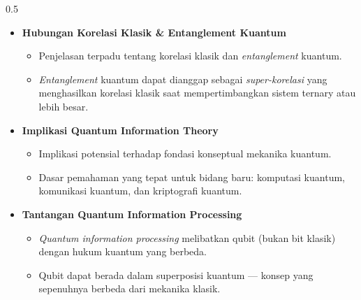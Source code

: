 \begin{frame}
\begin{columns}[T]
        \begin{column}{0.5\textwidth}
            \begin{itemize}\tiny\justifying
                \item \textbf{Hubungan Korelasi Klasik \& Entanglement Kuantum}
                    \begin{itemize}\tiny\justifying
                        \item[$\Rightarrow$] Penjelasan terpadu tentang korelasi klasik
                            dan \textit{entanglement} kuantum.
                        \item[$\Rightarrow$] \textit{Entanglement} kuantum dapat dianggap
                            sebagai \textit{super-korelasi} yang menghasilkan korelasi
                            klasik saat mempertimbangkan sistem ternary atau lebih besar.
                    \end{itemize}
                \item \textbf{Implikasi Quantum Information Theory}
                    \begin{itemize}\tiny\justifying
                        \item[$\Rightarrow$] Implikasi potensial terhadap fondasi
                            konseptual mekanika kuantum.
                        \item[$\Rightarrow$] Dasar pemahaman yang tepat untuk bidang baru:
                            komputasi kuantum, komunikasi kuantum, dan kriptografi kuantum.
                    \end{itemize}
                \item \textbf{Tantangan Quantum Information Processing}
                    \begin{itemize}\tiny\justifying
                        \item[$\Rightarrow$] \textit{Quantum information processing}
                            melibatkan qubit (bukan bit klasik) dengan hukum kuantum
                            yang berbeda.
                        \item[$\Rightarrow$] Qubit dapat berada dalam superposisi
                            kuantum --- konsep yang sepenuhnya berbeda dari mekanika klasik.
                    \end{itemize}
            \end{itemize}
        \end{column}
    \end{columns}
\end{frame}

